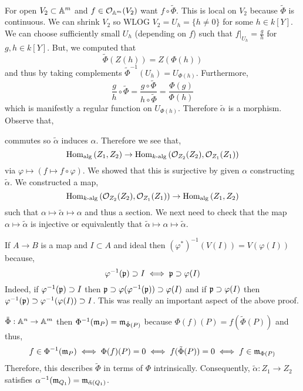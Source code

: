 \documentclass[12pt]{article}
\begin{document}
\begin{example}
\bigskip\\
For open $V_2 \subset \mathbb{A}^m$ and $f \in \mathcal{O}_{\mathbb{A}^m}(V_2)$ want $f \circ \tilde{\Phi}$. This is local on $V_2$ because $\tilde{\Phi}$ is continuous. We can shrink $V_2$ so WLOG $V_2 = U_h = \{ h \neq 0 \}$ for some $h \in k[Y]$. We can choose sufficiently small $U_h$ (depending on $f$) such that $f|_{U_h} = \frac{g}{h}$ for $g,h \in k[Y]$. But, we computed that
\[ \tilde{\Phi}(Z(h)) = Z(\Phi(h)) \]
and thus by taking complements $\tilde{\Phi}^{-1}(U_h) = U_{\Phi(h)}$. Furthermore,
\[ \frac{g}{h} \circ \tilde{\Phi} = \frac{g \circ \tilde{\Phi}}{h \circ \tilde{\Phi}} = \frac{\Phi(g)}{\Phi(h)} \]
which is manifestly a regular function on $U_{\Phi(h)}$. Therefore $\tilde{\alpha}$ is a morphism.
\bigskip\\
Observe that,
\begin{center}
\end{center}
commutes so $\tilde{\alpha}$ induces $\alpha$. Therefore we see that,
\[ \mathrm{Hom}_{\text{alg}} \left( Z_1, Z_2 \right) \to \mathrm{Hom}_{k\text{-alg}} \left( \mathcal{O}_{Z_2}(Z_2), \mathcal{O}_{Z_1}(Z_1) \right) \]
via $\varphi \mapsto (f \mapsto f \circ \varphi)$. We showed that this is surjective by given $\alpha$ constructing $\tilde{\alpha}$. We constructed a map,
\[  \mathrm{Hom}_{k\text{-alg}} \left( \mathcal{O}_{Z_2}(Z_2), \mathcal{O}_{Z_1}(Z_1) \right) \to \mathrm{Hom}_{\text{alg}} \left( Z_1, Z_2 \right) \]
such that $\alpha \mapsto \tilde{\alpha} \mapsto \alpha$ and thus a section. We next need to check that the map $\alpha \mapsto \tilde{\alpha}$ is injective or equivalently that $\tilde{\alpha} \mapsto \alpha \mapsto \tilde{\alpha}$. 
\end{example}

\begin{rmk}
If $A \to B$ is a map and $I \subset A$ and ideal then $(\varphi^*)^{-1}(V(I)) = V(\varphi(I))$ because,
\[ \varphi^{-1}(\mathfrak{p}) \supset I \iff \mathfrak{p} \supset \varphi(I) \]
Indeed, if $\varphi^{-1}(\mathfrak{p}) \supset I$ then $\mathfrak{p} \supset \varphi(\varphi^{-1}(\mathfrak{p})) \supset \varphi(I)$ and if $\mathfrak{p} \supset \varphi(I)$ then $\varphi^{-1}(\mathfrak{p}) \supset \varphi^{-1}(\varphi(I)) \supset I$. This was really an important aspect of the above proof.
\end{rmk}

\begin{rmk}
$\tilde{\Phi}:  \mathbb{A}^n \to \mathbb{A}^m$ then $\Phi^{-1}(\mathfrak{m}_P) = \mathfrak{m}_{\tilde{\Phi}(P)}$ because $\Phi(f)(P) = f(\tilde{\Phi}(P))$ and thus,
\[ f \in \Phi^{-1}(\mathfrak{m}_P) \iff \Phi(f)(P) = 0 \iff f(\tilde{\Phi}(P)) = 0 \iff f \in \mathfrak{m}_{\Phi(P)} \]
Therefore, this describes $\tilde{\Phi}$ in terms of $\Phi$ intrinsically. Consequently, $\tilde{\alpha} : Z_1 \to Z_2$ satisfies $\alpha^{-1}(\mathfrak{m}_{Q_1}) = \mathfrak{m}_{\tilde{\alpha}(Q_1)}$. 
\end{rmk}
\end{document}
